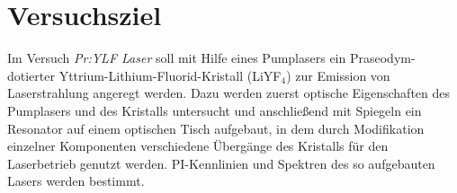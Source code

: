 \section{Versuchsziel}

Im Versuch \emph{Pr:YLF Laser} soll mit Hilfe eines Pumplasers ein Praseodym-dotierter
Yttrium-Lithium-Fluorid-Kristall (LiYF$_4$) zur Emission von Laserstrahlung angeregt werden.
Dazu werden zuerst optische Eigenschaften des Pumplasers und des Kristalls untersucht und
anschließend mit Spiegeln ein Resonator auf einem optischen Tisch aufgebaut,
in dem durch Modifikation einzelner Komponenten verschiedene Übergänge des Kristalls für den
Laserbetrieb genutzt werden.
PI-Kennlinien und Spektren des so aufgebauten Lasers werden bestimmt.
